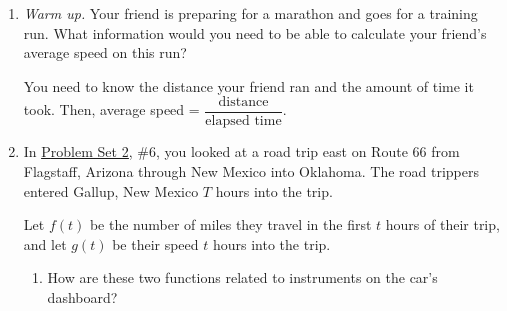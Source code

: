 \documentclass{article}
\makeatletter
\let\@href=\href
\renewcommand{\href}[2]{\@href{#1}{\ul{#2}}}
\makeatother
\begin{document}
\begin{enumerate}
\item 


  \begin{problem}[0.5in]
    \emph{Warm up.} Your friend is preparing for a marathon and goes
    for a training run. What information would you need to be able to
    calculate your friend's average speed on this run?
  \end{problem}

  \begin{solution}
    You need to know the distance your friend ran and the amount of
    time it took. Then, average speed =
    $\dfrac{\text{distance}}{\text{elapsed time}}$. 
  \end{solution}

\item  \label{gottlieb-1.2.12-followup}


  In \href{https://people.math.harvard.edu/~jjchen/mathma/docs/homework/PS02.html}{Problem Set 2}, {{\#6}}, you looked at a road trip east on Route 66
  from Flagstaff, Arizona through New Mexico into Oklahoma. The road
  trippers entered Gallup, New Mexico $T$ hours into the trip.

  Let $f(t)$ be the number of miles they travel in the first $t$ hours of their trip, and let $g(t)$ be their speed $t$ hours into the trip.

  \begin{enumerate}
  \item
    \begin{problem}[\stretch{1.5}]
      How are these two functions related to instruments on the car's dashboard?
    \end{problem}


\end{enumerate}
\end{enumerate}
\end{document}
